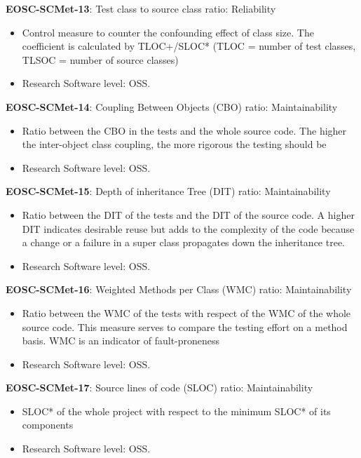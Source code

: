 \textbf{EOSC-SCMet-13}: Test class to source class ratio: Reliability

\begin{itemize}
    \item Control measure to counter the confounding effect of class size. The coefficient is calculated by TLOC+/SLOC*  (TLOC = number of test classes, TLSOC = number of source classes)~\cite{nagappan_early_2005}
    \item Research Software level: OSS.
\end{itemize}

\textbf{EOSC-SCMet-14}: Coupling Between Objects (CBO) ratio: Maintainability

\begin{itemize}
    \item Ratio between the CBO in the tests and the whole source code. The higher the inter-object class coupling, the more rigorous the testing should be~\cite{nagappan_early_2005}
    \item Research Software level: OSS.
\end{itemize}

\textbf{EOSC-SCMet-15}: Depth of inheritance Tree (DIT) ratio: Maintainability

\begin{itemize}
    \item Ratio between the DIT of the tests and the DIT of the source code. A higher DIT indicates desirable reuse but adds to the
complexity of the code because a change or a failure in a super class propagates down the inheritance tree.~\cite{nagappan_early_2005}
    \item Research Software level: OSS.
\end{itemize}

\textbf{EOSC-SCMet-16}: Weighted Methods per Class (WMC) ratio: Maintainability

\begin{itemize}
    \item Ratio between the WMC of the tests with respect of the WMC of the whole source code. This measure serves to compare the testing effort on a method basis. WMC is an indicator of fault-proneness~\cite{nagappan_early_2005}
    \item Research Software level: OSS.
\end{itemize}

\textbf{EOSC-SCMet-17}: Source lines of code (SLOC) ratio: Maintainability

\begin{itemize}
    \item SLOC* of the whole project with respect to the minimum SLOC* of its components~\cite{nagappan_early_2005}
    \item Research Software level: OSS.
\end{itemize}

